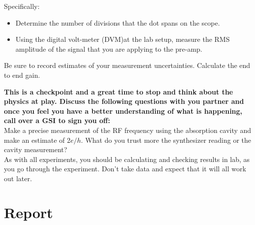 \documentclass{../lab}
\begin{document}
\vspace{1em}

\noindent Specifically:

\begin{itemize}
    \item Determine the number of divisions that the dot spans on the scope.

    \item Using the digital volt-meter (DVM)at the lab setup, measure the RMS amplitude of the signal that you are applying to the pre-amp.
\end{itemize}

Be sure to record estimates of your measurement uncertainties. Calculate the end to end gain.

\textbf{This is a checkpoint and a great time to stop and think about the physics at play. Discuss the following questions with you partner and once you feel you have a better understanding of what is happening, call over a GSI to sign you off:}\\
Make a precise measurement of the RF frequency using the absorption cavity and make an estimate of 2$e/h$. What do you trust more the synthesizer reading or the cavity measurement? \\

As with all experiments, you should be calculating and checking results in lab, as you go through the experiment. Don't take data and expect that it will all work out later.

\section{Report}
\end{document}
